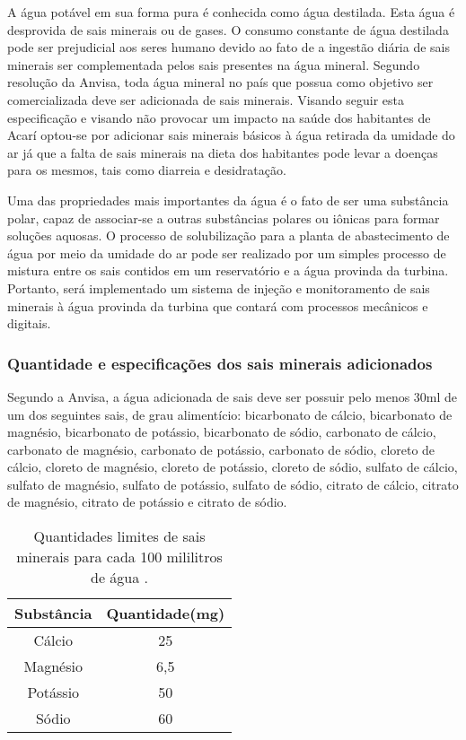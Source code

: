 
A água potável em sua forma pura é conhecida como água destilada. Esta água é desprovida de sais minerais ou de gases.
O consumo constante de água destilada pode ser prejudicial aos seres humano devido ao fato de a ingestão diária de sais
minerais ser complementada pelos sais presentes na água mineral. Segundo resolução da Anvisa, toda água mineral no país 
que possua como objetivo ser comercializada deve ser adicionada de sais minerais. Visando seguir esta especificação e
visando não provocar um impacto na saúde dos habitantes de Acarí optou-se por adicionar sais minerais básicos à água
retirada da umidade do ar já que a falta de sais minerais na dieta dos habitantes pode levar a doenças para os mesmos,
tais como diarreia e desidratação.

Uma das propriedades mais importantes da água é o fato de ser uma substância polar, capaz de associar-se a outras substâncias 
polares ou iônicas para formar soluções aquosas. O processo de solubilização para a planta de abastecimento de água por meio
da umidade do ar pode ser realizado por um simples processo de mistura entre os sais contidos em um reservatório e a água
provinda da turbina. Portanto, será implementado um sistema de injeção e monitoramento de sais minerais à água provinda da
turbina que contará com processos mecânicos e digitais.

\subsubsection*{Quantidade e especificações dos sais minerais adicionados}

  Segundo a Anvisa, a água adicionada de sais  deve ser possuir pelo menos 30ml de um dos seguintes sais, de grau alimentício:
  bicarbonato de cálcio, bicarbonato de magnésio, bicarbonato de potássio, bicarbonato de sódio, carbonato de cálcio, carbonato
  de magnésio, carbonato de potássio, carbonato de sódio, cloreto de cálcio, cloreto de magnésio, cloreto de potássio, cloreto
  de sódio, sulfato de cálcio, sulfato de magnésio, sulfato de potássio, sulfato de sódio, citrato de cálcio, citrato de magnésio,
  citrato de potássio e citrato de sódio.
  
  \begin{table}[h]
    \centering
    \begin{tabular}{|c|c|}
    
    \hline
    Substância & Quantidade(mg)\\
    \hline                               
    Cálcio & 25\\
    \hline                               
    Magnésio & 6,5\\
    \hline                               
    Potássio & 50\\
    \hline                               
    Sódio & 60\\
    \hline
    \end{tabular}
    \caption{Quantidades limites de sais minerais para cada 100 mililitros de água \cite{anvisa05}.}
  \end{table}
  

